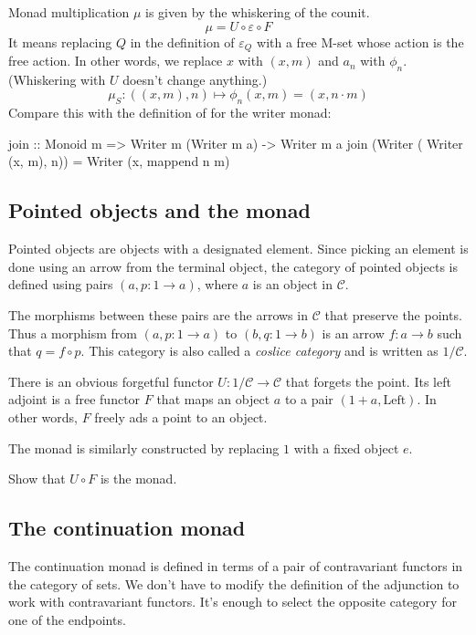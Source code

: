 \documentclass[DaoFP]{subfiles}
\begin{document}
Monad multiplication $\mu$ is given by the whiskering of the counit.
\[ \mu = U \circ \varepsilon \circ F \]
It means replacing $Q$ in the definition of $\varepsilon_Q$ with a free M-set whose action is the free action. In other words, we replace $x$ with $(x, m)$ and $a_n$ with $\phi_n$. (Whiskering with $U$ doesn't change anything.)
\[ \mu_S \colon ((x, m), n) \mapsto \phi_n (x, m) = (x, n \cdot m) \]
Compare this with the definition of  for the writer monad:
\begin{haskell}
join :: Monoid m => Writer m (Writer m a) -> Writer m a
join (Writer ( Writer (x, m), n)) = Writer (x, mappend n m)
\end{haskell}

\subsection{Pointed objects and the  monad}

Pointed objects are objects with a designated element. Since picking an element is done using an arrow from the terminal object, the category of pointed objects is defined using pairs $(a, p \colon 1 \to a)$, where $a$ is an object in $\mathcal{C}$. 

The morphisms between these pairs are the arrows in $\mathcal{C}$ that preserve the points. Thus a morphism from $(a, p \colon 1 \to a)$ to $(b, q \colon 1 \to b)$ is an arrow $f \colon a \to b$ such that $q = f \circ p$. This category is also called a \emph{coslice category} and is written as $1/\mathcal{C}$.

There is an obvious forgetful functor $U \colon 1/\mathcal{C} \to \mathcal{C}$ that forgets the point. Its left adjoint is a free functor $F$ that maps an object $a$ to a pair $(1 + a, \text{Left})$. In other words, $F$ freely ads a point to an object. 

The  monad is similarly constructed by replacing $1$ with a fixed object $e$.

\begin{exercise}
Show that $U \circ F$ is the  monad.
\end{exercise}

\subsection{The continuation monad}

The continuation monad is defined in terms of a pair of contravariant functors in the category of sets. We don't have to modify the definition of the adjunction to work with contravariant functors. It's enough to select the opposite category for one of the endpoints. 
\end{document}

